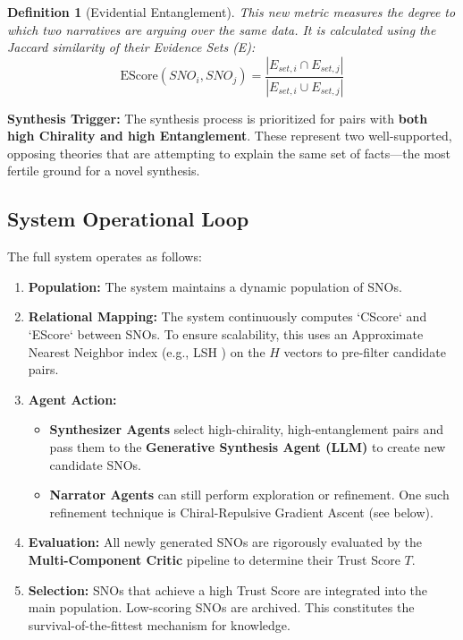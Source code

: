 \documentclass[12pt, a4paper]{article}
\newtheorem{definition}{Definition}[section]
\begin{document}
\begin{definition}[Evidential Entanglement]
This new metric measures the degree to which two narratives are arguing over the same data. It is calculated using the Jaccard similarity of their \textit{Evidence Sets (E)}:
\[
\text{EScore}(SNO_i, SNO_j) = \frac{|E_{set, i} \cap E_{set, j}|}{|E_{set, i} \cup E_{set, j}|}
\]
\end{definition}

\textbf{Synthesis Trigger:} The synthesis process is prioritized for pairs with \textbf{both high Chirality and high Entanglement}. These represent two well-supported, opposing theories that are attempting to explain the same set of facts—the most fertile ground for a novel synthesis.

\subsection{System Operational Loop}
The full system operates as follows:
\begin{enumerate}
    \item \textbf{Population:} The system maintains a dynamic population of SNOs.
    \item \textbf{Relational Mapping:} The system continuously computes `CScore` and `EScore` between SNOs. To ensure scalability, this uses an Approximate Nearest Neighbor index (e.g., LSH \cite{Indyk1998LSH}) on the $H$ vectors to pre-filter candidate pairs.
    \item \textbf{Agent Action:}
        \begin{itemize}
            \item \textbf{Synthesizer Agents} select high-chirality, high-entanglement pairs and pass them to the \textbf{Generative Synthesis Agent (LLM)} to create new candidate SNOs.
            \item \textbf{Narrator Agents} can still perform exploration or refinement. One such refinement technique is Chiral-Repulsive Gradient Ascent (see below).
        \end{itemize}
    \item \textbf{Evaluation:} All newly generated SNOs are rigorously evaluated by the \textbf{Multi-Component Critic} pipeline to determine their Trust Score $T$.
    \item \textbf{Selection:} SNOs that achieve a high Trust Score are integrated into the main population. Low-scoring SNOs are archived. This constitutes the survival-of-the-fittest mechanism for knowledge.
\end{enumerate}
\end{document}
